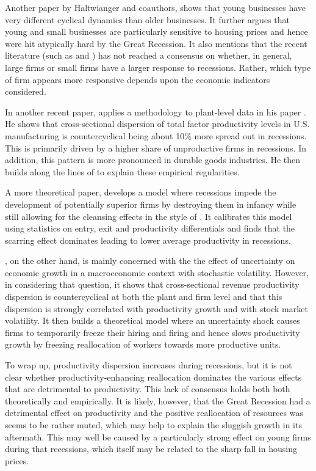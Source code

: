 \documentclass[11pt]{amsart}
\begin{document}
Another paper by Haltwianger and coauthors, \cite{fort2013how} shows that young businesses have very different cyclical dynamics than older businesses. 
It further argues that young and small businesses are particularly sensitive to housing prices and hence were hit atypically hard by the Great Recession.
It also mentions that the recent literature (such as \cite{gertler1994monetary} and \cite{chari2007gertler}) has not reached a consensus on whether, in general, large firms or small firms have a larger response to recessions.
Rather, which type of firm appears more responsive depends upon the economic indicators considered.

In another recent paper, \citeauthor{kehrig2011cyclicality} applies a \cite{olley1996dynamics} methodology to plant-level data in his paper .
He shows that cross-sectional dispersion of total factor productivity levels in U.S. manufacturing is countercyclical being about 10\% more spread out in recessions. 
This is primarily driven by a higher share of unproductive firms in recessions. 
In addition, this pattern is more pronounced in durable goods industries. 
He then builds along the lines of \cite{ghironi2005international} to explain these empirical regularities. 

A more theoretical paper, \cite{ouyang2009scarring} develops a model where recessions impede the development of potentially superior firms by destroying them in infancy while still allowing for the cleansing effects in the style of \cite{caballero1994cleansing}. 
It calibrates this model using statistics on entry, exit and productivity differentials and finds that the scarring effect dominates leading to lower average productivity in recessions. 

\cite{bloom2009impact}, on the other hand, is mainly concerned with the the effect of uncertainty on economic growth in a macroeconomic context with stochastic volatility.
However, in considering that question, it shows that cross-sectional revenue productivity dispersion is countercyclical at both the plant and firm level and that this dispersion is strongly correlated with productivity growth and with stock market volatility.  
It then builds a theoretical model where an uncertainty shock causes firms to temporarily freeze their hiring and firing and hence slows productivity growth by freezing reallocation of workers towards more productive units. 


To wrap up, productivity dispersion increases during recessions, but it is not clear whether productivity-enhancing reallocation dominates the various effects that are detrimental to productivity.
This lack of consensus holds both both theoretically and empirically.
It is likely, however, that the Great Recession had a detrimental effect on productivity and the positive reallocation of resources was seems to be rather muted, which may help to explain the sluggish growth in its aftermath.
This may well be caused by a particularly strong effect on young firms during that recessions, which itself may be related to the sharp fall in housing prices. 



\newpage
\printbibliography
\end{document}
